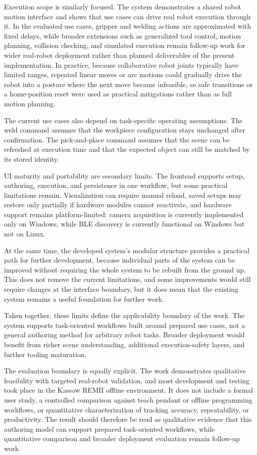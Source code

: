 Execution scope is similarly focused. The system demonstrates a shared robot motion interface and shows that use cases can drive real robot execution through it. In the evaluated use cases, gripper and welding actions are approximated with fixed delays, while broader extensions such as generalized tool control, motion planning, collision checking, and simulated execution remain follow-up work for wider real-robot deployment rather than planned deliverables of the present implementation. In practice, because collaborative robot joints typically have limited ranges, repeated linear moves or arc motions could gradually drive the robot into a posture where the next move became infeasible, so safe  transitions or a home-position reset were used as practical mitigations rather than as full motion planning.

The current use cases also depend on task-specific operating assumptions. The weld command assumes that the workpiece configuration stays unchanged after confirmation. The pick-and-place command assumes that the scene can be refreshed at execution time and that the expected object can still be matched by its stored identity.

UI maturity and portability are secondary limits. The frontend supports setup, authoring, execution, and persistence in one workflow, but some practical limitations remain. Visualization can require manual reload, saved setups may restore only partially if hardware modules cannot reactivate, and hardware support remains platform-limited: camera acquisition is currently implemented only on Windows, while BLE discovery is currently functional on Windows but not on Linux.

At the same time, the developed system's modular structure provides a practical path for further development, because individual parts of the system can be improved without requiring the whole system to be rebuilt from the ground up. This does not remove the current limitations, and some improvements would still require changes at the interface boundary, but it does mean that the existing system remains a useful foundation for further work.

Taken together, these limits define the applicability boundary of the work. The system supports task-oriented workflows built around prepared use cases, not a general authoring method for arbitrary robot tasks. Broader deployment would benefit from richer scene understanding, additional execution-safety layers, and further tooling maturation.

The evaluation boundary is equally explicit. The work demonstrates qualitative feasibility with targeted real-robot validation, and most development and testing took place in the Kassow REMII offline environment. It does not include a formal user study, a controlled comparison against teach pendant or offline programming workflows, or quantitative characterization of tracking accuracy, repeatability, or productivity. The result should therefore be read as qualitative evidence that this authoring model can support prepared task-oriented workflows, while quantitative comparison and broader deployment evaluation remain follow-up work.
